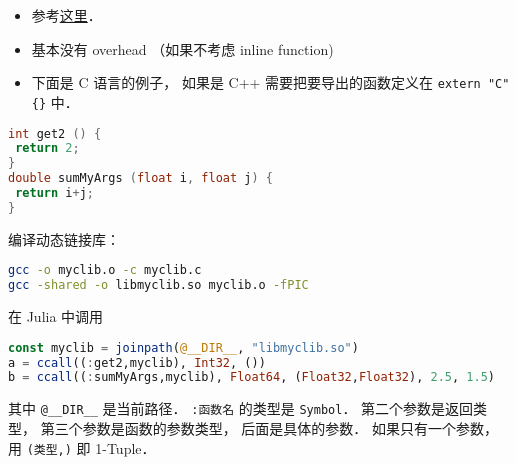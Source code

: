 
\begin{issues}
\issueDraft
\end{issues}

\begin{itemize}
\item 参考\href{https://docs.julialang.org/en/v1/manual/calling-c-and-fortran-code/}{这里}．
\item 基本没有 overhead （如果不考虑 inline function)
\item 下面是 C 语言的例子， 如果是 C++ 需要把要导出的函数定义在 \verb|extern "C" {}| 中．
\end{itemize}

\begin{lstlisting}[language=cpp]
int get2 () {
 return 2;
}
double sumMyArgs (float i, float j) {
 return i+j;
}
\end{lstlisting}

编译动态链接库：
\begin{lstlisting}[language=bash]
gcc -o myclib.o -c myclib.c
gcc -shared -o libmyclib.so myclib.o -fPIC
\end{lstlisting}

在 Julia 中调用
\begin{lstlisting}[language=julia]
const myclib = joinpath(@__DIR__, "libmyclib.so")
a = ccall((:get2,myclib), Int32, ())
b = ccall((:sumMyArgs,myclib), Float64, (Float32,Float32), 2.5, 1.5)
\end{lstlisting}
其中 \verb|@__DIR__| 是当前路径． \verb|:函数名| 的类型是 \verb|Symbol|． 第二个参数是返回类型， 第三个参数是函数的参数类型， 后面是具体的参数． 如果只有一个参数， 用 \verb|(类型,)| 即 1-Tuple．
